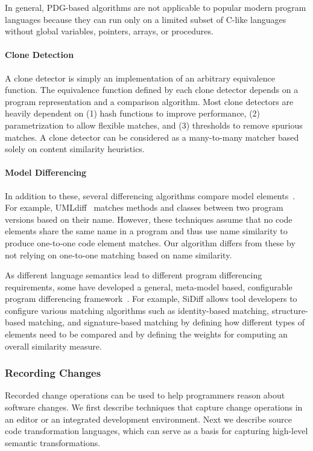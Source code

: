 \documentclass[runningheads,a4paper]{llncs}
\begin{document}
In general, PDG-based algorithms are not applicable to popular modern program languages because they can run only on a limited subset of C-like languages without global variables, pointers, arrays, or procedures. 


\paragraph{Clone Detection} 
A clone detector is simply an implementation of an arbitrary equivalence function. The equivalence function defined by each clone detector depends on a program representation and a comparison algorithm. Most clone detectors are heavily dependent on (1) hash functions to improve performance, (2) parametrization to allow flexible matches, and (3) thresholds to remove spurious matches. A clone detector can be considered as a many-to-many matcher based solely on content similarity heuristics. 

\paragraph{Model Differencing} 
In addition to these, several differencing algorithms compare model elements~\cite{Xing2005, Ohst2003:umldiff, Soto2006:deltaprocess}. For example, UMLdiff~\cite{Xing2005} matches methods and classes between two program versions based on their name. However, these techniques assume that no code elements share the same name in a program and thus use name similarity to produce one-to-one code element matches. Our algorithm differs from these by not relying on one-to-one matching based on name similarity. 


As different language semantics lead to different program differencing requirements, some have developed a general, meta-model based, configurable program differencing framework~\cite{Schmidt2008:sidiff, EMF}. For example, SiDiff \cite{Schmidt2008:sidiff, Treude2007:sidiff} allows tool developers to configure various matching algorithms such as identity-based matching, structure-based matching, and signature-based matching by defining how different types of elements need to be compared and by defining the weights for computing an overall similarity measure.

\subsubsection{Recording Changes} 
Recorded change operations can be used to help programmers reason about software changes. We first describe techniques that capture change operations in an editor or an integrated development environment. Next we describe source code transformation languages, which can serve as a basis for capturing high-level semantic transformations. 
\end{document}
